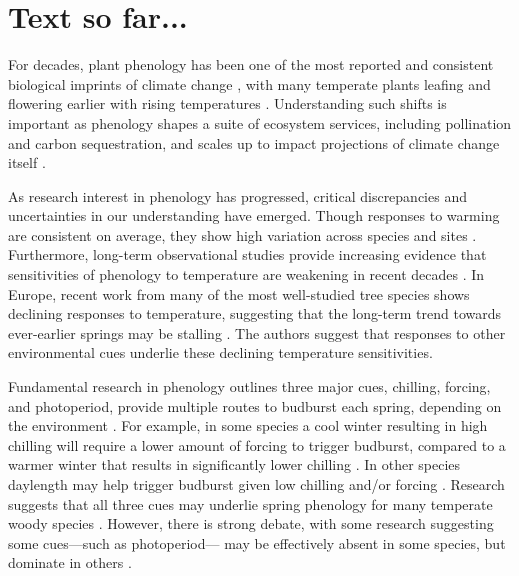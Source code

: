 \documentclass{article}
\begin{document}
\section* {Text so far...}

\par For decades, plant phenology has been one of the most reported and consistent biological imprints of climate change \citep{IPCC:2014sm}, with many temperate plants leafing and flowering earlier with rising temperatures \citep{millerrushing2008,menzel2006}. Understanding such shifts is important as phenology shapes a suite of ecosystem services, including pollination and carbon sequestration, and scales up to impact projections of climate change itself \cite{diez2012}. 

\par As research interest in phenology has progressed, critical discrepancies and uncertainties in our understanding have emerged. Though responses to warming are consistent on average, they show high variation across species and sites \citep{Wolkovich:2012n}. Furthermore, long-term observational studies provide increasing evidence that sensitivities of phenology to temperature are weakening in recent decades \citep{Rutishauser:2008,yu2010,fu2015}. In Europe, recent work from many of the most well-studied tree species shows declining responses to temperature, suggesting that the long-term trend towards ever-earlier springs may be stalling \citep{fu2015}. The authors suggest that responses to other environmental cues underlie these declining temperature sensitivities.
\par Fundamental research in phenology outlines three major cues,  chilling, forcing, and photoperiod, provide multiple routes to budburst each spring, depending on the environment \citep{chuineJTB}. For example, in some species a cool winter resulting in high chilling will require a lower amount of forcing to trigger budburst, compared to a warmer winter that results in significantly lower chilling \citep{harrington2015}. In other species daylength may help trigger budburst given low chilling and/or forcing \citep{Basler:2014aa, Caffarra:2011b, zohner2016}. Research suggests that all three cues may underlie spring phenology for many temperate woody species \citep{flynn2018,Basler:2014aa,Caffarra:2011qf}. However, there is strong debate, with some research suggesting some cues---such as photoperiod--- may be effectively absent in some species, but dominate in others \citep{zohner2016,koerner2010a}. 
\end{document}
